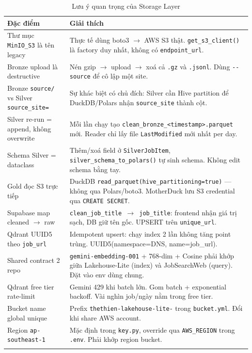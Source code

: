 \begin{longtable}{p{} p{}}
\toprule
\textbf{Đặc điểm} & \textbf{Giải thích} \\
\midrule
Thư mục \texttt{MinIO\_S3} là tên legacy & Thực tế dùng boto3 $\rightarrow$ AWS S3 thật. \texttt{get\_s3\_client()} là factory duy nhất, không có \texttt{endpoint\_url}. \\
\addlinespace
Bronze upload là destructive & Nén gzip $\rightarrow$ upload $\rightarrow$ xoá cả \texttt{.gz} và \texttt{.jsonl}. Dùng \texttt{-{}-source} để cô lập một site. \\
\addlinespace
Bronze \texttt{source/} vs Silver \texttt{source\_site=} & Sự khác biệt có chủ đích: Silver cần Hive partition để DuckDB/Polars nhận \texttt{source\_site} thành cột. \\
\addlinespace
Silver re-run = append, không overwrite & Mỗi lần chạy tạo \texttt{clean\_bronze\_<timestamp>.parquet} mới. Reader chỉ lấy file \texttt{LastModified} mới nhất per day. \\
\addlinespace
Schema Silver = dataclass & Thêm/xoá field ở \texttt{SilverJobItem}, \texttt{silver\_schema\_to\_polars()} tự sinh schema. Không edit schema bằng tay. \\
\addlinespace
Gold đọc S3 trực tiếp & DuckDB \texttt{read\_parquet(hive\_partitioning=true)} --- không qua Polars/boto3. MotherDuck lưu S3 credential qua \texttt{CREATE SECRET}. \\
\addlinespace
Supabase map cleaned $\rightarrow$ raw & \texttt{clean\_job\_title $\rightarrow$ job\_title}: frontend nhận giá trị sạch, DB giữ tên gốc. UPSERT trên \texttt{unique\_url}. \\
\addlinespace
Qdrant UUID5 theo \texttt{job\_url} & Idempotent upsert: chạy index 2 lần không tăng point trùng. UUID5(namespace=DNS, name=job\_url). \\
\addlinespace
Shared contract 2 repo & \texttt{gemini-embedding-001} + 768-dim + Cosine phải khớp giữa Lakehouse-Lite (index) và JobSearchWeb (query). Đặt vào env dùng chung. \\
\addlinespace
Qdrant free tier rate-limit & Gemini 429 khi batch lớn. Gom batch + exponential backoff. Vài nghìn job/ngày nằm trong free tier. \\
\addlinespace
Bucket name global unique & Prefix \texttt{thethien-lakehouse-lite-} trong \texttt{bucket.yml}. Đổi khi share AWS account. \\
\addlinespace
Region \texttt{ap-southeast-1} & Mặc định trong \texttt{key.py}, override qua \texttt{AWS\_REGION} trong \texttt{.env}. Phải khớp region bucket. \\
\bottomrule
\caption{Lưu ý quan trọng của Storage Layer}
\label{tab:storage-gotchas}
\end{longtable}


